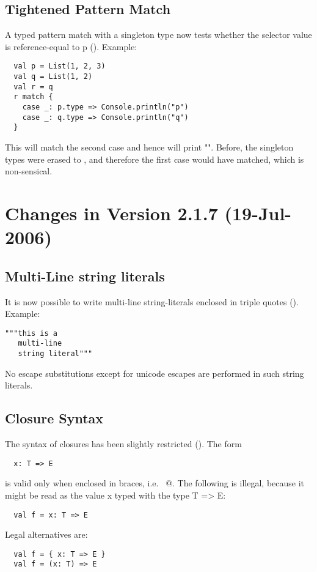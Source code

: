 \subsection*{Tightened Pattern Match}

A typed pattern match with a singleton type 
now tests whether the selector value is reference-equal to p
(). 
Example:
\begin{lstlisting}
  val p = List(1, 2, 3)
  val q = List(1, 2)
  val r = q
  r match {
    case _: p.type => Console.println("p")
    case _: q.type => Console.println("q")
  }
\end{lstlisting}
This will match the second case and hence will print "". 
Before, the singleton types were erased to , and therefore
the first case 
would have matched, which is non-sensical.

\section*{Changes in Version 2.1.7 (19-Jul-2006)}

\subsection*{Multi-Line string literals} It is now possible to write
multi-line string-literals enclosed in triple quotes
(). 
Example:
\begin{lstlisting}
"""this is a
   multi-line
   string literal"""
\end{lstlisting}
No escape substitutions except for unicode escapes are performed in
such string literals.

\subsection*{Closure Syntax}

The syntax of closures has been slightly restricted (). The form
\begin{lstlisting}
  x: T => E
\end{lstlisting}
is valid only when enclosed in braces, i.e. ~@. 
The following is illegal, because it might be read as the value x typed with the type T => E:
\begin{lstlisting}
  val f = x: T => E
\end{lstlisting}
Legal alternatives are:
\begin{lstlisting}
  val f = { x: T => E }
  val f = (x: T) => E
\end{lstlisting}

